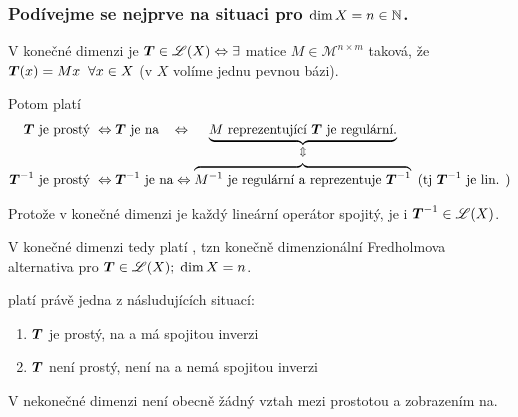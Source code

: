 \subsubsection{Podívejme se nejprve na situaci pro $\dim X=n\in \mathbb{N}$.}

V konečné dimenzi je $ \boldsymbol{T} \in \mathscr{L}(X)\Leftrightarrow \exists$ matice $M\in \mathcal{M}^{n\times m}$ taková, že $ \boldsymbol{T} (x)=Mx \;\;\forall x \in X$ (v $X$ volíme jednu pevnou bázi).

Potom platí 
\begin{align}
\boldsymbol{T}  \text{ je prostý } &\Leftrightarrow   \boldsymbol{T}  \text{ je na } \;\;\Leftrightarrow \;\;\;\;\, \underbrace{M \text{ reprezentující }  \boldsymbol{T}  \text{ je regulární.}}_{ \Updownarrow}  \\  
 \boldsymbol{T} ^{-1} \text{ je prostý } &\Leftrightarrow  \boldsymbol{T} ^{-1} \text{ je na} \Leftrightarrow \overbrace{M^{-1} \text{ je regulární a reprezentuje }  \boldsymbol{T} ^{-1} }\text{ (tj }  \boldsymbol{T} ^{-1} \text{ je lin. )}
\end{align}

Protože v konečné dimenzi je každý lineární operátor spojitý, je i $ \boldsymbol{T} ^{-1}\in\mathscr{L}(X)$.

V konečné dimenzi tedy platí , tzn konečně dimenzionální Fredholmova alternativa pro $ \boldsymbol{T} \in\mathscr{L}(X);\;\dim X=n$.

platí právě jedna z násludujících situací:
\begin{enumerate}
    \item $ \boldsymbol{T} $ je prostý, na a má spojitou inverzi
    \item $ \boldsymbol{T} $ není prostý, není na a nemá spojitou inverzi
\end{enumerate}
V nekonečné dimenzi není obecně žádný vztah mezi prostotou a zobrazením na.

